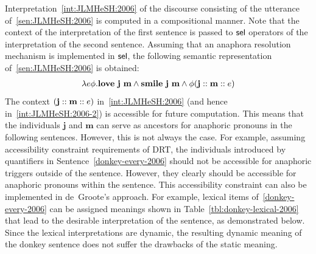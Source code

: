 Interpretation~\eqref{int:JLMHeSH:2006} of the discourse consisting of the utterance of~\eqref{sen:JLMHeSH:2006} is computed in a compositional manner. Note that the context of the interpretation of the first sentence is passed to $\mathsf{sel}$ operators of the interpretation of the second sentence. Assuming that an anaphora resolution mechanism is implemented in $\mathsf{sel}$, the following semantic representation of~\eqref{sen:JLMHeSH:2006} is obtained: 
\begin{align}
\lambda e \phi.\textbf{love} \  \textbf{j} \ \textbf{m} \land    \textbf{smile}  \ \textbf{j} \ \textbf{m} \land \phi  (\textbf{j} :: \textbf{m} :: e) \label{int:JLMHeSH:2006-2}
\end{align}
The context $(\textbf{j} :: \textbf{m} :: e)$ in~\eqref{int:JLMHeSH:2006} (and hence in~\eqref{int:JLMHeSH:2006-2})  is accessible for future computation. This means that the individuals $\textbf{j}$ and $\textbf{m}$ can serve as ancestors for anaphoric pronouns in the following sentences. However, this is not always the case. For example, assuming accessibility constraint requirements of DRT, the individuals introduced by quantifiers in Sentence~\eqref{donkey-every-2006} should not be accessible for anaphoric triggers outside of the sentence. However, they clearly should be accessible for anaphoric pronouns within the sentence. 
This accessibility constraint can also be implemented in de~Groote's approach. For example, lexical items of~\eqref{donkey-every-2006} can be assigned meanings shown in Table~\ref{tbl:donkey-lexical-2006} that lead to the desirable interpretation of the sentence, as demonstrated below. Since the lexical interpretations are dynamic, the resulting dynamic meaning of the donkey sentence does not suffer the drawbacks of the static meaning.

